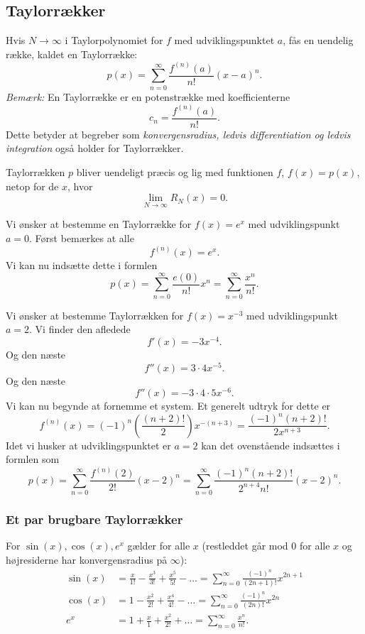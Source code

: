 \subsection{Taylorrækker}
Hvis $N \to \infty$ i Taylorpolynomiet for $f$ med udviklingspunktet $a$, fås en uendelig række, kaldet en Taylorrække:
\[ 
p(x) = \sum_{n = 0}^{\infty} \frac{f^{(n)}(a)}{n!}(x-a)^{n}
.\]
\textit{Bemærk:} En Taylorrække er en potenstrække med koefficienterne
\[ 
c_n = \frac{f^{(n)}(a)}{n!}
.\]
Dette betyder at begreber som \textit{konvergensradius, ledvis differentiation og ledvis integration} også holder for Taylorrækker.

Taylorrækken $p$ bliver uendeligt præcis og lig med funktionen $f$, $f(x) = p(x)$, netop for de $x$, hvor
\[ 
\lim_{N \to \infty } R_N(x) = 0
.\]


\begin{eks} 
  Vi ønsker at bestemme en Taylorrække for $f(x) = e^{x}$ med udviklingspunkt $a = 0$.
  \bigbreak
  Først bemærkes at alle
  \[ 
  f^{(n)}(x) = e^{x}
  .\]
  Vi kan nu indsætte dette i formlen
  \[ 
  p(x) = \sum_{n = 0}^{\infty} \frac{e(0)}{n!} x^{n} = \sum_{n = 0}^{\infty} \frac{x^{n}}{n!}
  .\]
\end{eks}


\begin{eks} 
  Vi ønsker at bestemme Taylorrækken for $f(x) = x^{-3}$ med udviklingspunkt $a = 2$.
  \bigbreak
  Vi finder den afledede
  \[ 
  f'(x) = -3x^{-4}
  .\]
  Og den næste
  \[ 
  f''(x) = 3\cdot 4x^{-5}
  .\]
  Og den næste
  \[ 
  f''(x) = -3\cdot 4\cdot 5x^{-6}
  .\]
  Vi kan nu begynde at fornemme et system. Et generelt udtryk for dette er
  \[ 
  f^{(n)}(x) = (-1)^{n} \left( \frac{(n+2)!}{2} \right) x^{-(n+3)} = \frac{(-1)^{n}(n+2)!}{2x^{n+3}} 
  .\]
  Idet vi husker at udviklingspunktet er $a = 2$ kan det ovenstående indsættes i formlen som
  \[ 
    p(x) = \sum_{n = 0}^{\infty} \frac{f^{(n)}(2)}{2!}(x-2)^{n} = \sum_{n = 0}^{\infty} \frac{(-1)^{n}(n+2)!}{2^{n+4}n!}(x-2)^{n}
  .\]
\end{eks}

\subsubsection{Et par brugbare Taylorrækker}
For $\sin(x), \cos(x), e^{x}$ gælder for alle $x$ (restleddet går mod 0 for alle $x$ og højresiderne har konvergensradius på $\infty$):
\begin{align*}
  \sin(x) &= \frac{x}{1!} - \frac{x^3}{3!} + \frac{x^{5}}{5!} - \ldots = \sum_{n = 0}^{\infty} \frac{(-1)^{n}}{(2n+1)!}x^{2n+1} \\
  \cos(x) &= 1 - \frac{x^2}{2!} + \frac{x^{4}}{4!} - \ldots = \sum_{n = 0}^{\infty} \frac{(-1)^{n}}{(2n)!}x^{2n} \\
  e^{x} &= 1 + \frac{x}{1} + \frac{x^2}{2!} + \ldots = \sum_{n = 0}^{\infty} \frac{x^{n}}{n!}
.\end{align*}


